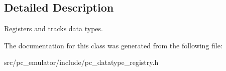 \subsection{Detailed Description}
Registers and tracks data types. 

The documentation for this class was generated from the following file\+:\begin{DoxyCompactItemize}
\item 
src/pc\+\_\+emulator/include/pc\+\_\+datatype\+\_\+registry.\+h\end{DoxyCompactItemize}
